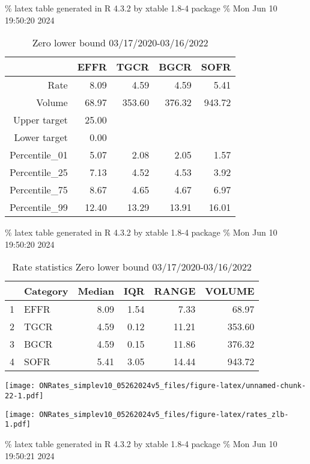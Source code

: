 \documentclass[
]{article}
\begin{document}
\% latex table generated in R 4.3.2 by xtable 1.8-4 package
\% Mon Jun 10 19:50:20 2024

\begin{table}[ht]
\centering
\begin{tabular}{rrrrr}
  \hline
 & EFFR & TGCR & BGCR & SOFR \\ 
  \hline
Rate & 8.09 & 4.59 & 4.59 & 5.41 \\ 
  Volume & 68.97 & 353.60 & 376.32 & 943.72 \\ 
  Upper target & 25.00 &  &  &  \\ 
  Lower target & 0.00 &  &  &  \\ 
  Percentile\_01 & 5.07 & 2.08 & 2.05 & 1.57 \\ 
  Percentile\_25 & 7.13 & 4.52 & 4.53 & 3.92 \\ 
  Percentile\_75 & 8.67 & 4.65 & 4.67 & 6.97 \\ 
  Percentile\_99 & 12.40 & 13.29 & 13.91 & 16.01 \\ 
   \hline
\end{tabular}
\caption{Zero lower bound 03/17/2020-03/16/2022} 
\end{table}

\% latex table generated in R 4.3.2 by xtable 1.8-4 package
\% Mon Jun 10 19:50:20 2024

\begin{table}[ht]
\centering
\begin{tabular}{rlrrrr}
  \hline
 & Category & Median & IQR & RANGE & VOLUME \\ 
  \hline
1 & EFFR & 8.09 & 1.54 & 7.33 & 68.97 \\ 
  2 & TGCR & 4.59 & 0.12 & 11.21 & 353.60 \\ 
  3 & BGCR & 4.59 & 0.15 & 11.86 & 376.32 \\ 
  4 & SOFR & 5.41 & 3.05 & 14.44 & 943.72 \\ 
   \hline
\end{tabular}
\caption{Rate statistics Zero lower bound 03/17/2020-03/16/2022} 
\end{table}

\texttt{[image: ONRates\_simplev10\_05262024v5\_files/figure-latex/unnamed-chunk-22-1.pdf]}

\texttt{[image: ONRates\_simplev10\_05262024v5\_files/figure-latex/rates\_zlb-1.pdf]}

\% latex table generated in R 4.3.2 by xtable 1.8-4 package
\% Mon Jun 10 19:50:21 2024
\end{document}
